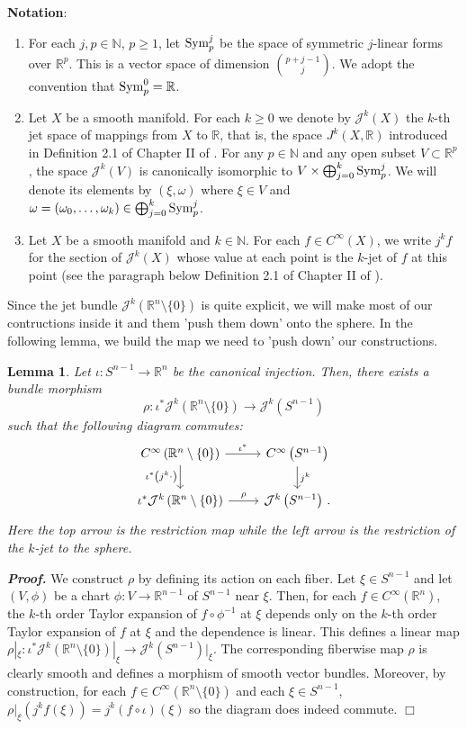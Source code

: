 \documentclass[10pt,twoside]{article}
\newcommand{\R}{\mathbb{R}}
\newcommand{\N}{\mathbb{N}}
\newcommand{\calJ}{\mathcal{J}}
\newcommand{\Rnzls}{\mathbb{R}^n\setminus\{0\}}
\newcommand{\Sym}{\textup{Sym}}
\newenvironment{prf}[1][]
{\vskip 2mm  {\it \bf Proof#1. }}{$\Box$ \vskip 2mm}
\newenvironment{notation}
{\vskip 2mm \textbf{Notation}:\vskip 2mm}{}
\numberwithin{theorem}{section}
\newtheorem{lemma}[theorem]{Lemma}
\begin{document}
\begin{notation}
\begin{enumerate}
\item For each $j,p\in\N$, $p\geq 1$, let $\Sym_p^j$ be the space of symmetric $j$-linear forms over $\R^p$. This is a vector space of dimension $\binom{p+j-1}{j}$. We adopt the convention that $\Sym_p^0=\R$.
\item Let $X$ be a smooth manifold. For each $k\geq 0$ we denote by $\calJ^k(X)$ the $k$-th jet space of mappings from $X$ to 
$\R$, that is, the space $J^k(X,\R)$ introduced in Definition 2.1 of Chapter II of \cite{gg_stable}. For any $p\in\N$ and any open subset $V\subset\R^p$, the space $\calJ^k(V)$ is canonically isomorphic to $V\times\bigoplus_{j=0}^k\Sym_p^j$. We will denote its elements by $(\xi,\omega)$ where $\xi\in V$ and $\omega=(\omega_0,\dots,\omega_k)\in\bigoplus_{j=0}^k\Sym_p^j$.
\item Let $X$ be a smooth manifold and $k\in\N$. For each $f\in C^\infty(X)$, we write $j^kf$ for the section of $\calJ^k(X)$ whose value at each point is the $k$-jet of $f$ at this point (see the paragraph below Definition 2.1 of Chapter II of \cite{gg_stable}).
\end{enumerate}
\end{notation}

Since the jet bundle $\calJ^k\left(\Rnzls\right)$ is quite explicit, we will make most of our contructions inside it and them 'push them down' onto the sphere. In the following lemma, we build the map we need to 'push down' our constructions.
\begin{lemma}\label{l.jet_restriction_map}
 Let $\iota :S^{n-1}\rightarrow\R^n$ be the canonical injection. Then, there exists a bundle morphism
\[
\rho:\iota^*\calJ^k\left(\Rnzls\right)\rightarrow\calJ^k\left(S^{n-1}\right)
\]
such that the following diagram commutes:
\[
\begin{tikzcd}
C^\infty\left(\Rnzls\right)\arrow{r}{\iota^*}  \arrow[swap]{d}{\iota^*\left(j^k\cdot\right)} & C^\infty\left(S^{n-1}\right) \arrow{d}{j^k}\\
\iota^*\calJ^k\left(\Rnzls\right)\arrow{r}{\rho} & \calJ^k\left(S^{n-1}\right)\, .
\end{tikzcd}
\]
Here the top arrow is the restriction map while the left arrow is the restriction of the $k$-jet to the sphere.
\end{lemma}
\begin{prf}
We construct $\rho$ by defining its action on each fiber. Let $\xi\in S^{n-1}$ and let $(V,\phi)$ be a chart $\phi:V\rightarrow\R^{n-1}$ of $S^{n-1}$ near $\xi$. Then, for each $f\in C^\infty\left(\R^n\right)$, the $k$-th order Taylor expansion of $f\circ\phi^{-1}$ at $\xi$ depends only on the $k$-th order Taylor expansion of $f$ at $\xi$ and the dependence is linear. This defines a linear map $\rho|_\xi:\iota^*\calJ^k\left(\Rnzls\right)|_\xi\rightarrow\calJ^k\left(S^{n-1}\right)|_\xi$. The corresponding fiberwise map $\rho$ is clearly smooth and defines a morphism of smooth vector bundles. Moreover, by construction, for each $f\in C^\infty\left(\Rnzls\right)$ and each $\xi\in S^{n-1}$, $\rho|_\xi\left(j^kf(\xi)\right)=j^k(f\circ\iota)(\xi)$ so the diagram does indeed commute.
\end{prf}
\end{document}
